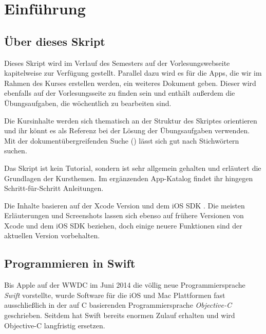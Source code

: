 \documentclass[parskip=half, final]{scrreprt}
\begin{document}
\maketitle

\tableofcontents

\chapter{Einführung}

\section{Über dieses Skript}

Dieses Skript wird im Verlauf des Semesters auf der Vorlesungswebseite  kapitelweise zur Verfügung gestellt. Parallel dazu wird es für die Apps, die wir im Rahmen des Kurses erstellen werden, ein weiteres Dokument geben. Dieser  wird ebenfalls auf der Vorlesungsseite zu finden sein und enthält außerdem die Übungsaufgaben, die wöchentlich zu bearbeiten sind.

Die Kursinhalte werden sich thematisch an der Struktur des Skriptes orientieren und ihr könnt es als Referenz bei der Lösung der Übungsaufgaben verwenden. Mit der dokumentübergreifenden Suche () lässt sich gut nach Stichwörtern suchen.

Das Skript ist kein Tutorial, sondern ist sehr allgemein gehalten und erläutert die Grundlagen der Kursthemen. Im ergänzenden App-Katalog findet ihr hingegen Schritt-für-Schritt Anleitungen.

Die Inhalte basieren auf der Xcode Version \vxcode{} und dem iOS SDK \vios{}. Die meisten Erläuterungen und Screenshots lassen sich ebenso auf frühere Versionen von Xcode und dem iOS SDK beziehen, doch einige neuere Funktionen sind der aktuellen Version vorbehalten.


\section{Programmieren in Swift}

Bis Apple auf der WWDC im Juni 2014 die völlig neue Programmiersprache \emph{Swift} vorstellte, wurde Software für die iOS und Mac Plattformen fast ausschließlich in der auf C basierenden Programmiersprache \emph{Objective-C} geschrieben. Seitdem hat Swift bereits enormen Zulauf erhalten und wird Objective-C langfristig ersetzen.
\end{document}
